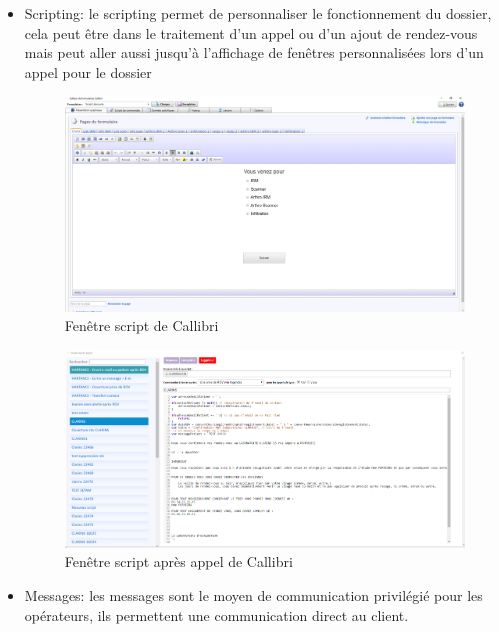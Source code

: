 \begin{itemize}
    \item Scripting: le scripting permet de personnaliser le fonctionnement du dossier,
    cela peut être dans le traitement d'un appel ou d'un ajout de rendez-vous mais
    peut aller aussi jusqu'à l'affichage de fenêtres personnalisées lors d'un appel pour le dossier 
    \newline

    \begin{figure}[!h]
        \centering
        \includegraphics[width=1.0\linewidth]{Images/callibri_script_labrouste_1}
        \caption{Fenêtre script de Callibri}
        \label{fig:callibriscripting1}
    \end{figure}

    \begin{figure}[!h]
        \centering
        \includegraphics[width=1.1\linewidth]{Images/scriptaftercall}
        \caption{Fenêtre script après appel de Callibri}
        \label{fig:callibriscripting2}
    \end{figure}
    
    \item Messages: les messages sont le moyen de communication privilégié pour les opérateurs,
    ils permettent une communication direct au client.
    \newline


\end{itemize}

